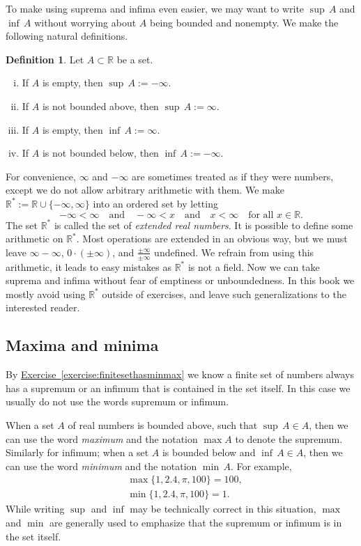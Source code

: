 \documentclass[12pt]{book}
\newcommand{\R}{{\mathbb{R}}}
\newcommand{\myindex}[1]{#1\index{#1}}
\theoremstyle{plain}
\theoremstyle{remark}
\theoremstyle{definition}
\newtheorem{defn}[thm]{Definition}
\theoremstyle{exercise}
\theoremstyle{example}
\newcommand{\exerciseref}[1]{\hyperref[#1]{Exercise~\ref*{#1}}}
\begin{document}
To make using suprema and infima even easier, we may want to
write $\sup\, A$ and $\inf\, A$ without worrying about $A$ being
bounded and nonempty.  We make the following natural definitions.

\begin{defn}
Let $A \subset \R$ be a set.
\begin{enumerate}[(i)]
\item If $A$ is empty, then $\sup\, A := -\infty$.
\item If $A$ is not bounded above, then $\sup\, A := \infty$.
\item If $A$ is empty, then $\inf\, A := \infty$.
\item If $A$ is not bounded below, then $\inf\, A := -\infty$.
\end{enumerate}
\end{defn}

For convenience,  $\infty$ and $-\infty$ are sometimes treated as if they were
numbers, except we do not allow arbitrary arithmetic with them.
We make $\R^* := \R \cup \{ -\infty , \infty\}$ into an ordered set
by letting
\begin{equation*}
-\infty < \infty \quad \text{and} \quad
-\infty < x \quad \text{and} \quad
x < \infty \quad \text{for all $x \in \R$}.
\end{equation*}
The set $\R^*$ is called the set of \emph{\myindex{extended real numbers}}.
It is possible to define some arithmetic on $\R^*$.  Most operations
are extended in an obvious way, but we must leave
$\infty-\infty$, $0 \cdot (\pm\infty)$, and $\frac{\pm\infty}{\pm\infty}$
undefined.
We refrain from
using this arithmetic,
it leads to easy mistakes as $\R^*$ is not a field.
Now we can take suprema and infima without fear of emptiness or
unboundedness.  In this book we mostly avoid
using $\R^*$ outside of exercises, and leave such generalizations to the interested reader.

\subsection{Maxima and minima}

By \exerciseref{exercise:finitesethasminmax} we know 
a finite set of numbers always has a supremum or an infimum that is contained
in the set itself.  In this case we usually do not use the words
supremum or infimum.

When a set $A$ of real numbers is bounded above,
such that 
$\sup\, A \in A$, then we can use the word
\emph{\myindex{maximum}} and the notation $\max A$ to denote the supremum.
Similarly for infimum; when a set $A$ is bounded below
and $\inf\, A \in A$, then we can use the
word \emph{\myindex{minimum}} and the notation $\min\, A$.  For example,
\begin{align*}
& \max \{ 1,2.4,\pi,100 \} = 100 , \\
& \min \{ 1,2.4,\pi,100 \} = 1 .
\end{align*}
While writing $\sup$ and $\inf$ may be technically
correct in this situation, $\max$ and
$\min$ are generally used to emphasize that the supremum or infimum
is in the set itself.
\end{document}
